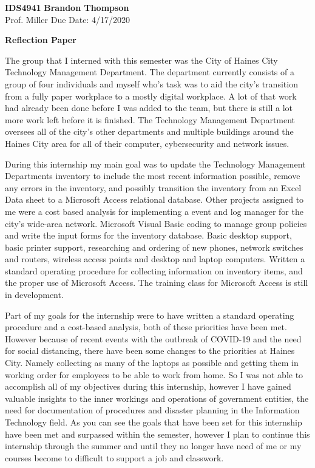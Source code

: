 \documentclass[12pt]{article}
\begin{document}
\noindent
\textbf{IDS4941} \hfill \textbf{Brandon Thompson} \\
\normalsize Prof. Miller \hfill Due Date: 4/17/2020 \\

\begin{center}
\textbf{Reflection Paper}
\end{center}

\doublespacing
	The group that I interned with this semester was the City of
	Haines City Technology Management Department. The department currently consists
	of a group of four individuals and myself who's task was to aid the city's
	transition from a fully paper workplace to a mostly digital workplace.
	A lot of that work had already been done before I was added to the team, but there
	is still a lot more work left before it is finished. The Technology Management Department
	oversees all of the city's other departments and multiple buildings around the Haines
	City area for all of their computer, cybersecurity and network issues.

	During this internship my main goal was to update the Technology Management Departments
	inventory to include the most recent information possible, remove any errors in the
	inventory, and possibly transition the inventory from an Excel Data sheet to a Microsoft
	Access relational database. Other projects assigned to me were a cost based analysis for
	implementing a event and log manager for the city's wide-area network. Microsoft Visual
	Basic coding to manage group policies and write the input forms for the inventory database.
	Basic desktop support, basic printer support, researching and ordering of new phones,
	network switches and routers, wireless access points and desktop and laptop computers.
	Written a standard operating procedure for collecting information on inventory items,
	and the proper use of Microsoft Access. The training class for Microsoft Access is still
	in development.

	Part of my goals for the internship were to have written a standard operating procedure
	and a cost-based analysis, both of these priorities have been met. However because of
	recent events with the outbreak of COVID-19 and the need for social distancing, there
	have been some changes to the priorities at Haines City. Namely collecting as many of
	the laptops as possible and getting them in working order for employees to be able to work
	from home. So I was not able to accomplish all of my objectives during this internship,
	however I have gained valuable insights to the inner workings and operations of government
	entities, the need for documentation of procedures and disaster planning in the Information
	Technology field. As you can see the goals that have been set for this internship have
	been met and surpassed within the semester, however I plan to continue this internship
	through the summer and until they no longer have need of me or my courses become to
	difficult to support a job and classwork.
\end{document}
